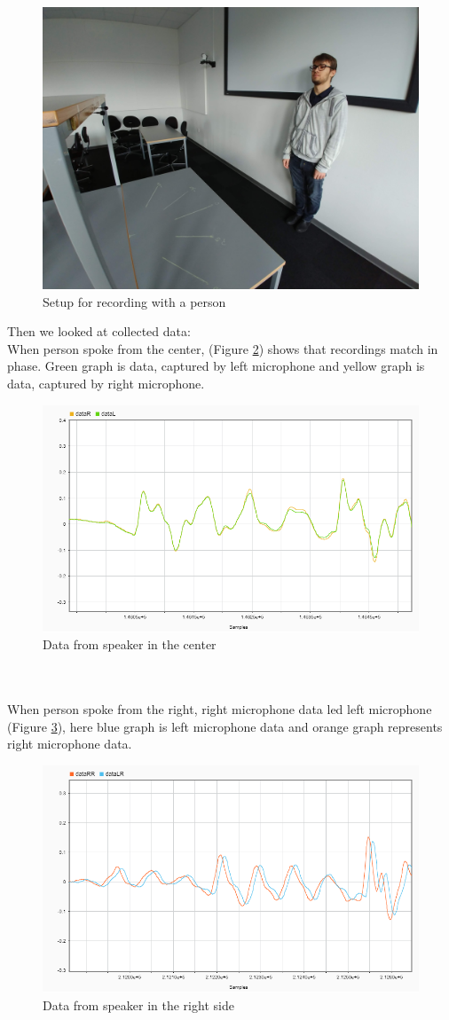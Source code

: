 \begin{figure}[htp]
	\centering
	\includegraphics[width=.7\textwidth]{Illustrations/razvanWithSetup.jpg}
	\caption{Setup for recording with a person}
	\label{fig:RanzvanRecSetup}
\end{figure}

Then we looked at collected data:\\
When person spoke from the center, (Figure \ref{fig:C}) shows that recordings match in phase. Green graph is 
data, captured by left microphone and yellow graph is data, captured by right microphone.
\begin{figure}[htp]
  \centering
  \includegraphics[width=0.75\linewidth]{Illustrations/DataC.png}
  \caption{Data from speaker in the center}
  \label{fig:C}
\end{figure}
\\
\\

When person spoke from the right, right microphone data led left microphone (Figure \ref{fig:R}), here blue graph is left microphone data and orange graph represents right microphone data.\\
\begin{figure}[htp]
  \centering
  \includegraphics[width=0.75\linewidth]{Illustrations/DataR.png}
  \caption{Data from speaker in the right side}
  \label{fig:R}
\end{figure}

